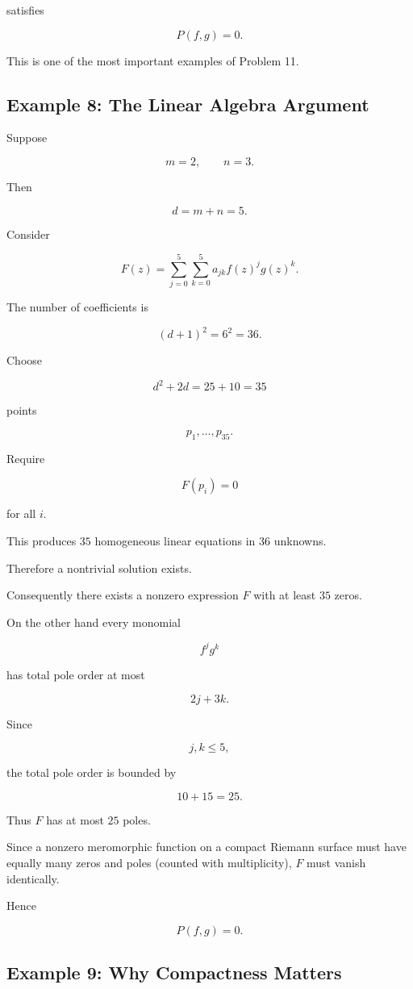 \documentclass[12pt,a4paper]{article}
\theoremstyle{notespace}
\begin{document}
satisfies

\[
P(f,g)=0.
\]

This is one of the most important examples of Problem 11.

\subsection{Example 8: The Linear Algebra Argument}

Suppose

\[
m=2,
\qquad
n=3.
\]

Then

\[
d=m+n=5.
\]

Consider

\[
F(z)
=
\sum_{j=0}^{5}
\sum_{k=0}^{5}
a_{jk}f(z)^jg(z)^k.
\]

The number of coefficients is

\[
(d+1)^2
=
6^2
=
36.
\]

Choose

\[
d^2+2d
=
25+10
=
35
\]

points

\[
p_1,\dots,p_{35}.
\]

Require

\[
F(p_i)=0
\]

for all \(i\).

This produces \(35\) homogeneous linear equations in \(36\) unknowns.

Therefore a nontrivial solution exists.

Consequently there exists a nonzero expression \(F\) with at least \(35\) zeros.

On the other hand every monomial

\[
f^jg^k
\]

has total pole order at most

\[
2j+3k.
\]

Since

\[
j,k\le 5,
\]

the total pole order is bounded by

\[
10+15=25.
\]

Thus \(F\) has at most \(25\) poles.

Since a nonzero meromorphic function on a compact Riemann surface must have equally many zeros and poles (counted with multiplicity), \(F\) must vanish identically.

Hence

\[
P(f,g)=0.
\]

\subsection{Example 9: Why Compactness Matters}
\end{document}
